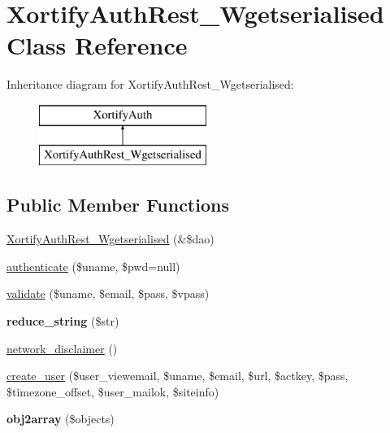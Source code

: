 \hypertarget{class_xortify_auth_rest___wgetserialised}{\section{Xortify\-Auth\-Rest\-\_\-\-Wgetserialised Class Reference}
\label{class_xortify_auth_rest___wgetserialised}
}
Inheritance diagram for Xortify\-Auth\-Rest\-\_\-\-Wgetserialised\-:\begin{figure}[H]
\begin{center}
\leavevmode
\includegraphics[height=2.000000cm]{class_xortify_auth_rest___wgetserialised}
\end{center}
\end{figure}
\subsection*{Public Member Functions}
\begin{DoxyCompactItemize}
\item 
\hyperlink{class_xortify_auth_rest___wgetserialised_ab8118219d14f721b8613dcb75867b9f3}{Xortify\-Auth\-Rest\-\_\-\-Wgetserialised} (\&\$dao)
\item 
\hyperlink{class_xortify_auth_rest___wgetserialised_a6763ba67b27b290497fe87303de0f537}{authenticate} (\$uname, \$pwd=null)
\item 
\hyperlink{class_xortify_auth_rest___wgetserialised_adbecc2898439c09879a2015c34af0208}{validate} (\$uname, \$email, \$pass, \$vpass)
\item 
\hypertarget{class_xortify_auth_rest___wgetserialised_a9bb0f4bf99f132021ee85ff3194c29a2}{{\bfseries reduce\-\_\-string} (\$str)}\label{class_xortify_auth_rest___wgetserialised_a9bb0f4bf99f132021ee85ff3194c29a2}

\item 
\hyperlink{class_xortify_auth_rest___wgetserialised_a119655dfb4bbaf1f2882f8608bee6b8d}{network\-\_\-disclaimer} ()
\item 
\hyperlink{class_xortify_auth_rest___wgetserialised_a2776a7679441a4dfc959fa72aec2276c}{create\-\_\-user} (\$user\-\_\-viewemail, \$uname, \$email, \$url, \$actkey, \$pass, \$timezone\-\_\-offset, \$user\-\_\-mailok, \$siteinfo)
\item 
\hypertarget{class_xortify_auth_rest___wgetserialised_a0038ef1dc9649f7941d7ffacb8de736b}{{\bfseries obj2array} (\$objects)}\label{class_xortify_auth_rest___wgetserialised_a0038ef1dc9649f7941d7ffacb8de736b}

\end{DoxyCompactItemize}
